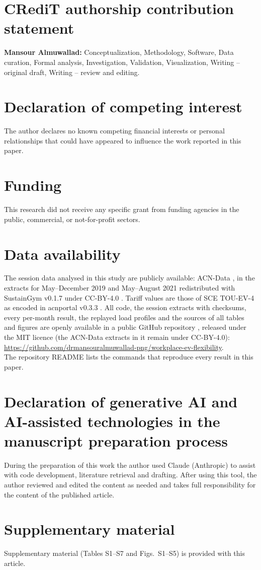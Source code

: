 \documentclass[preprint,11pt]{elsarticle}
\begin{document}
\section*{CRediT authorship contribution statement}
\textbf{Mansour Almuwallad:} Conceptualization, Methodology, Software, Data curation, Formal analysis, Investigation, Validation, Visualization, Writing -- original draft, Writing -- review and editing.

\section*{Declaration of competing interest}
The author declares no known competing financial interests or personal relationships that could have appeared to influence the work reported in this paper.

\section*{Funding}
This research did not receive any specific grant from funding agencies in the public, commercial, or not-for-profit sectors.

\section*{Data availability}
The session data analysed in this study are publicly available: ACN-Data \cite{Lee2019ACNData,ACNDataset}, in the extracts for May--December 2019 and May--August 2021 redistributed with SustainGym v0.1.7 under CC-BY-4.0 \cite{Yeh2023SustainGym}. Tariff values are those of SCE TOU-EV-4 as encoded in acnportal v0.3.3 \cite{SCETOUEV4}. All code, the session extracts with checksums, every per-month result, the replayed load profiles and the sources of all tables and figures are openly available in a public GitHub repository \cite{ThisStudyRepo}, released under the MIT licence (the ACN-Data extracts in it remain under CC-BY-4.0):\\ {\small\url{https://github.com/drmansouralmuwallad-png/workplace-ev-flexibility}}.\\ The repository README lists the commands that reproduce every result in this paper.

\section*{Declaration of generative AI and AI-assisted technologies in the manuscript preparation process}
During the preparation of this work the author used Claude (Anthropic) to assist with code development, literature retrieval and drafting. After using this tool, the author reviewed and edited the content as needed and takes full responsibility for the content of the published article.

\section*{Supplementary material}
Supplementary material (Tables S1--S7 and Figs.~S1--S5) is provided with this article.




\end{document}
